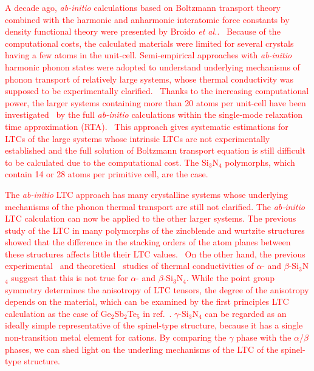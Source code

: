 \documentclass[twocolumn,amsmath,amssymb,a4paper,prb,superscriptaddress,floatfix]{revtex4-1}
\begin{document}
\textcolor{red}{A decade ago, {\it ab-initio} calculations based on
Boltzmann transport theory combined with the harmonic and anharmonic
interatomic force constants by density functional theory were presented
by Broido {\it et al.}.~\cite{broido} Because of the computational costs, the
calculated materials were limited for several crystals having a few
atoms in the unit-cell. Semi-empirical approaches with {\it ab-initio}
harmonic phonon states were adopted to understand underlying mechanisms
of phonon transport of relatively large systems, whose thermal
conductivity was supposed to be experimentally clarified.~\cite{thomas} Thanks to
the increasing computational power, the larger systems containing more
than 20 atoms per unit-cell have been investigated~\cite{mukhopadhyay} by the full {\it
ab-initio} calculations within the single-mode relaxation time
approximation (RTA).~\cite{ward-ltc,esfarjani-ltc} This approach gives systematic estimations
for LTCs of the large systems whose intrinsic LTCs are not
experimentally established and the full solution of Boltzmann transport
equation is still difficult to be calculated due to the computational
cost. The Si$_3$N$_4$ polymorphs, which contain 14 or 28 atoms per
primitive cell, are the case.}

\textcolor{red}{The {\it ab-initio} LTC approach has many crystalline
systems whose underlying mechanisms of the phonon thermal transport are
still not clarified. The {\it ab-initio} LTC calculation can now be
applied to the other larger systems. The previous study of the LTC in
many polymorphs of the zincblende and wurtzite structures showed that
the difference in the stacking orders of the atom planes between these
structures affects little their LTC values.~\cite{phono3py} On the other hand, the
previous experimental~\cite{hirosaki,hirai} and theoretical~\cite{hirosaki-md,morelli} studies of thermal
conductivities of $\alpha$- and $\beta$-Si$_3$N$_4$ suggest that this is
not true for $\alpha$- and $\beta$-Si$_3$N$_4$.  
While the point group symmetry determines the anisotropy of
LTC tensors, the degree of the anisotropy depends on the material, which can be examined by
the first principles LTC calculation as the case of Ge$_2$Sb$_2$Te$_5$
in ref.~. $\gamma$-Si$_3$N$_4$ can be regarded as an ideally simple
representative of the spinel-type structure, because it has a single
non-transition metal element for cations. By comparing the $\gamma$
phase with the $\alpha$/$\beta$ phases, we can shed light on the
underling mechanisms of the LTC of the spinel-type structure.}
\end{document}
